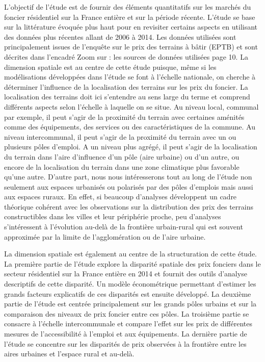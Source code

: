 \documentclass[10.5pt,a4paper]{article}
\begin{document}
{L'objectif de l'étude est de fournir des éléments quantitatifs sur les marchés du foncier résidentiel sur la France entière et sur la période récente. L'étude se base sur la littérature évoquée plus haut pour en revisiter certains aspects en utilisant des données plus récentes allant de 2006 à 2014. Les données utilisées sont principalement issues de l'enquête sur le prix des terrains à bâtir (EPTB) et sont décrites dans l'encadré \og Zoom sur : les sources de données utilisées \fg page 10. La dimension spatiale est au centre de cette étude puisque, même si les modélisations développées dans l'étude se font à l'échelle nationale, on cherche à déterminer l'influence de la localisation  des terrains sur les prix du foncier. La localisation des terrains doit ici s'entendre au sens large du terme et comprend différents aspects selon l'échelle à laquelle on se situe. Au niveau local, communal par exemple, il peut s'agir de la proximité du terrain avec certaines aménités comme des équipements, des services ou des caractéristiques de la commune. Au niveau intercommunal, il peut s'agir de la proximité du terrain avec un  ou plusieurs pôles d'emploi. A un niveau plus agrégé, il peut s'agir de la localisation du terrain dans l'aire d'influence d'un pôle (aire urbaine) ou d'un autre, ou  encore de la localisation du terrain dans une zone climatique plus favorable qu'une autre.  D'autre part, nous nous intéresserons tout au long de l'étude non seulement aux espaces urbanisés ou polarisés par des pôles d'emplois mais aussi aux espaces ruraux. En effet, si beaucoup d'analyses développent un cadre théorique cohérent avec les observations sur la distribution des prix des terrains constructibles dans les villes et leur périphérie proche, peu d'analyses s'intéressent à l'évolution au-delà de la frontière urbain-rural qui est souvent approximée par la limite de l'agglomération ou de l'aire urbaine. \par  

La dimension spatiale est également au centre de la structuration de cette étude. La première partie de l'étude explore la disparité spatiale des prix fonciers dans le secteur résidentiel sur la France entière en 2014 et fournit des outils d'analyse descriptifs de cette disparité. Un modèle économétrique permettant d'estimer les grands facteurs explicatifs de ces disparités est ensuite développé. La deuxième partie de l'étude est centrée principalement sur les grands pôles urbains et sur la comparaison des niveaux de prix foncier entre ces pôles. La troisième partie se consacre à l'échelle intercommunale et compare l'effet sur les prix de différentes mesures de l'accessibilité à l'emploi et aux équipements. La dernière partie de l'étude se concentre sur les disparités de prix observées à la frontière entre les aires urbaines et l'espace rural et au-delà. \par

}
\end{document}
